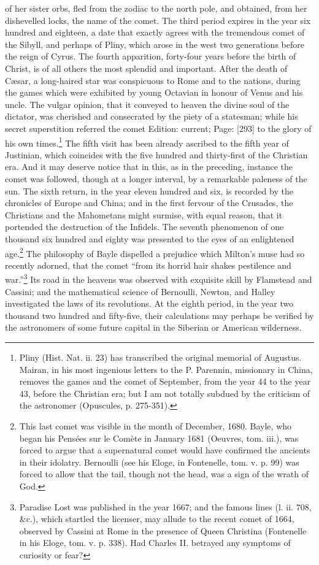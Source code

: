 of her sister orbs, fled from the zodiac to the north pole, and obtained, from her dishevelled locks, the name of the comet. The third period expires in the year six hundred and eighteen, a date that exactly agrees with the tremendous comet of the Sibyll, and perhaps of Pliny, which arose in the west two generations before the reign of Cyrus. The fourth apparition, forty-four years before the birth of Christ, is of all others the most splendid and important. After the death of Cæsar, a long-haired star was conspicuous to Rome and to the nations, during the games which were exhibited by young Octavian in honour of Venus and his uncle. The vulgar opinion, that it conveyed to heaven the divine soul of the dictator, was cherished and consecrated by the piety of a statesman; while his secret superstition referred the comet Edition: current; Page: [293] to the glory of his own times.\footnote{Pliny (Hist. Nat. ii. 23) has transcribed the original memorial of Augustus. Mairan, in his most ingenious letters to the P. Parennin, missionary in China, removes the games and the comet of September, from the year 44 to the year 43, before the Christian era; but I am not totally subdued by the criticism of the astronomer (Opuscules, p. 275-351).} The fifth visit has been already ascribed to the fifth year of Justinian, which coincides with the five hundred and thirty-first of the Christian era. And it may deserve notice that in this, as in the preceding, instance the comet was followed, though at a longer interval, by a remarkable paleness of the sun. The sixth return, in the year eleven hundred and six, is recorded by the chronicles of Europe and China; and in the first fervour of the Crusades, the Christians and the Mahometans might surmise, with equal reason, that it portended the destruction of the Infidels. The seventh phenomenon of one thousand six hundred and eighty was presented to the eyes of an enlightened age.\footnote{This last comet was visible in the month of December, 1680. Bayle, who began his Pensées sur le Comète in January 1681 (Oeuvres, tom. iii.), was forced to argue that a supernatural comet would have confirmed the ancients in their idolatry. Bernoulli (see his Eloge, in Fontenelle, tom. v. p. 99) was forced to allow that the tail, though not the head, was a sign of the wrath of God.} The philosophy of Bayle dispelled a prejudice which Milton\texthebrew{}’s muse had so recently adorned, that the comet \texthebrew{“}from its horrid hair shakes pestilence and war.\texthebrew{}”\footnote{Paradise Lost was published in the year 1667; and the famous lines (l. ii. 708, \&c.), which startled the licenser, may allude to the recent comet of 1664, observed by Cassini at Rome in the presence of Queen Christina (Fontenelle in his Eloge, tom. v. p. 338). Had Charles II. betrayed any symptoms of curiosity or fear?} Its road in the heavens was observed with exquisite skill by Flamstead and Cassini; and the mathematical science of Bernoulli, Newton, and Halley investigated the laws of its revolutions. At the eighth period, in the year two thousand two hundred and fifty-five, their calculations may perhaps be verified by the astronomers of some future capital in the Siberian or American wilderness.

